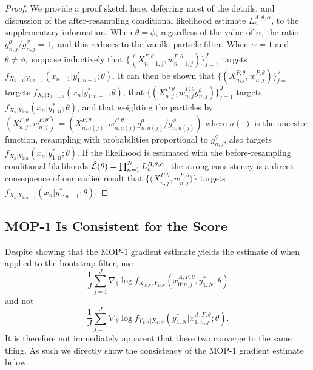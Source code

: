 \documentclass[11pt]{article}
\begin{document}

\begin{proof}
    We provide a proof sketch here, deferring most of the details, and discussion of the after-resampling conditional likelihood estimate $L_n^{A,\theta,\alpha}$, to the supplementary information. 
    When $\theta=\phi$, regardless of the value of $\alpha$, the ratio ${g_{n,j}^\theta}/{g_{n,j}^\phi}=1,$ and this reduces to the vanilla particle filter.
    When $\alpha=1$ and $\theta\neq\phi,$ suppose inductively that $\{(X^{F,\theta}_{n-1,j},w^{F,\theta}_{n-1,j})\}_{j=1}^J$ targets $f_{X_{n-1}|Y_{1:n-1}}(x_{n-1}|y^*_{1:n-1};\theta)$.
    It can then be shown that $\{(X^{P,\theta}_{n,j},w^{P,\theta}_{n,j})\}_{j=1}^J$ targets $f_{X_{n}|Y_{1:n-1}}(x_{n}|y^*_{1:n-1};\theta)$, that $\{(X^{P,\theta}_{n,j},w^{P,\theta}_{n,j} g^\theta_{n,j} )\}_{j=1}^J$ targets  $f_{X_{n}|Y_{1:n}}(x_{n}|y^*_{1:n};\theta)$, and that weighting the particles by $(X^{F,\theta}_{n,j},w^{F,\theta}_{n,j}) = (X^{P,\theta}_{n,a(j)}, w^{P,\theta}_{n,a(j)} g^\theta_{n,a(j)}/ g^\phi_{n,a(j)})$ where $a(\cdot)$ is the ancestor function,
    resampling with probabilities proportional to $g^\phi_{n,j}$, also targets $f_{X_{n}|Y_{1:n}}(x_{n}|y^*_{1:n};\theta)$.
    If the likelihood is estimated with the before-resampling conditional likelihoods $\hat{\mathcal{L}}(\theta) = \prod_{n=1}^N L_n^{B,\theta,\alpha}$, the strong consistency is a direct consequence of our earlier result that $\{ \big(X^{P,\theta}_{n,j},w^{P,\theta}_{n,j}\big) \}$ targets $f_{X_{n}|Y_{1:n-1}}(x_{n}|y^*_{1:n-1};\theta)$. 
\end{proof}




\subsection{MOP-$1$ Is Consistent for the Score}

Despite showing that the MOP-$1$ gradient estimate yields the estimate of \cite{poyiadjis11, scibior21} when applied to the bootstrap filter, \cite{poyiadjis11, scibior21} use
$$\frac{1}{J}\sum_{j=1}^J \nabla_\theta \log f_{X_{0:N}, Y_{1:N}}\left(x_{0:n,j}^{A, F,\theta}, y_{1:N}^* ; \theta\right)$$ and not
$$\frac{1}{J}\sum_{j=1}^J \nabla_\theta \log f_{Y_{1:N}| X_{1:N}}\left(y_{1:N}^* | x_{1:n,j}^{A, F,\theta}; \theta\right).$$
It is therefore not immediately apparent that these two converge to the same thing. As such we directly show the consistency of the MOP-$1$ gradient estimate below. 
\end{document}
